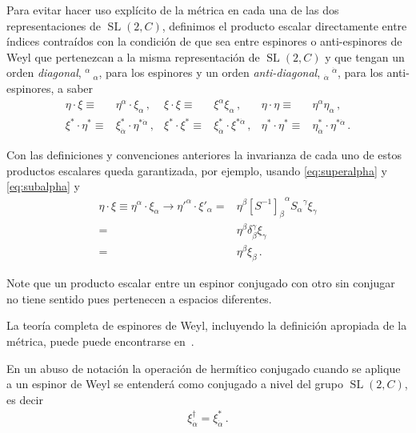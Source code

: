 \begin{frame}
Para evitar hacer uso explícito de la métrica en cada una de las dos representaciones de $\operatorname{SL}(2,C)$, definimos el producto escalar directamente entre índices contraídos con la condición de que sea entre espinores o anti-espinores de Weyl que pertenezcan a la misma representación de $\operatorname{SL}(2,C)$ y que tengan un orden \emph{diagonal}, ${}^{\alpha}\ {}_{\alpha}$, para los espinores y un orden \emph{anti-diagonal}, ${}_{\dot{\alpha}}\ {}^{\dot{\alpha}}$, para los anti-espinores, a saber
\begin{align}
  \eta\cdot\xi\equiv& \eta^{\alpha} \cdot \xi_{\alpha} \,,&
  \xi\cdot \xi\equiv&\xi^{\alpha}\xi_{\alpha}\,, &
  \eta\cdot\eta\equiv &\eta^{\alpha}\eta_{\alpha}\,,\nonumber\\
  \xi^{*}\cdot \eta^{*}\equiv & \xi^{*}_{\dot{\alpha}}\cdot \eta^{*\dot{\alpha}}\,,&
  \xi^{*}\cdot \xi^{*}\equiv & \xi^{*}_{\dot{\alpha}}\cdot \xi^{*\dot{\alpha}}\,,&
  \eta^{*}\cdot \eta^{*}\equiv & \eta^{*}_{\dot{\alpha}}\cdot \eta^{*\dot{\alpha}}\,.
\end{align}

Con las definiciones y convenciones anteriores la invarianza de cada uno de estos productos escalares queda garantizada, por ejemplo, usando \eqref{eq:superalpha} y \eqref{eq:subalpha} y 
\begin{align*}
  \eta\cdot\xi\equiv \eta^{\alpha} \cdot \xi_{\alpha} \to {\eta'}^{\alpha} \cdot \xi'_{\alpha}=&
       \eta^\beta {\left[  S^{-1}  \right]_{\beta}}^{\alpha}{S_\alpha}^\gamma \xi_\gamma\\
  =& \eta^\beta\delta_\beta^\gamma\xi_\gamma\\
  =& \eta^\beta\xi_\beta\,.
\end{align*}

Note que un producto escalar entre un espinor conjugado con otro sin conjugar no tiene sentido pues pertenecen a espacios diferentes.
\end{frame}



La teoría completa de espinores de Weyl, incluyendo la definición apropiada de la métrica, puede puede encontrarse en~\cite{Dreiner:2008tw}.

En un abuso de notación la operación de hermítico conjugado cuando se aplique a un espinor de Weyl se entenderá como conjugado a nivel del grupo $\operatorname{SL}(2,C)$, es decir
\begin{align}
  \xi_{\dot{\alpha}}^{\dagger}=\xi_{\dot{\alpha}}^{*}\,.
\end{align}


